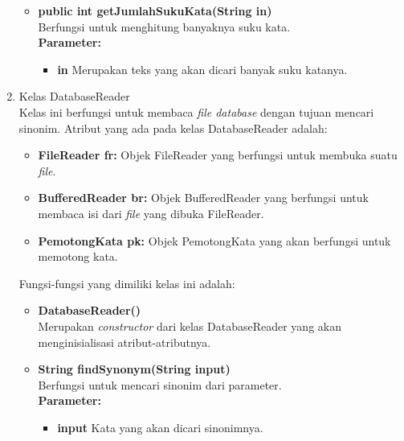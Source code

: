 \begin{enumerate}
\begin{itemize}
		\item \textbf{public int getJumlahSukuKata(String in)}\\
		Berfungsi untuk menghitung banyaknya suku kata.\\
		\textbf{Parameter:}
		\begin{itemize}
			\item \textbf{in} Merupakan teks yang akan dicari banyak suku katanya.
		\end{itemize}
	\end{itemize}
	
	\item Kelas DatabaseReader\\
	Kelas ini berfungsi untuk membaca \textit{file database} dengan tujuan mencari sinonim. Atribut yang ada pada kelas DatabaseReader adalah:
	\begin{itemize}
		\item \textbf{FileReader fr:} Objek FileReader yang berfungsi untuk membuka suatu \textit{file}.
		\item \textbf{BufferedReader br:} Objek BufferedReader yang berfungsi untuk membaca isi dari \textit{file} yang dibuka FileReader.
		\item \textbf{PemotongKata pk:} Objek PemotongKata yang akan berfungsi untuk memotong kata.
	\end{itemize}
	
	Fungsi-fungsi yang dimiliki kelas ini adalah:
	
	\begin{itemize}
		\item \textbf{DatabaseReader()}\\
		Merupakan \textit{constructor} dari kelas DatabaseReader yang akan menginisialisasi atribut-atributnya.
		\item \textbf{String findSynonym(String input)}\\
		Berfungsi untuk mencari sinonim dari parameter.\\
		\textbf{Parameter:}
		\begin{itemize}
			\item \textbf{input} Kata yang akan dicari sinonimnya.
		\end{itemize}
	\end{itemize}
	

\end{enumerate}
